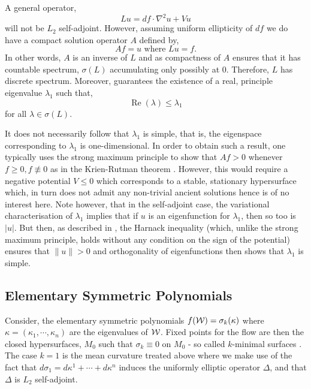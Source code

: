 \documentclass{amsart}
\begin{document}
A general operator,
\[
L u = df \cdot \nabla^2 u + V u
\]
will not be \(L_2\) self-adjoint. However, assuming uniform ellipticity of \(df\) we do have a compact solution operator \(A\) defined by,
\[
A f = u \text{ where } Lu = f.
\]
In other words, \(A\) is an inverse of \(L\) and as compactness of \(A\) ensures that it has countable spectrum, \(\sigma(L)\) accumulating only possibly at \(0\). Therefore, \(L\) has discrete spectrum. Moreover, \cite{protterweinberger:/1966} guarantees the existence of a real, principle eigenvalue \(\lambda_1\) such that,
\[
\operatorname{Re} (\lambda) \leq \lambda_1
\]
for all \(\lambda \in \sigma(L)\).

\begin{rem}
It does not necessarily follow that \(\lambda_1\) is simple, that is, the eigenspace corresponding to \(\lambda_1\) is one-dimensional. In order to obtain such a result, one typically uses the strong maximum principle to show that \(A f > 0\) whenever \(f \geq 0, f \not\equiv 0\) as in the Krien-Rutman theorem \cite{kreinrutman-en:1950, kreinrutman:1948}. However, this would require a negative potential \(V \leq 0\) which corresponds to a stable, stationary hypersurface which, in turn does not admit any non-trivial ancient solutions hence is of no interest here. Note however, that in the self-adjoint case, the variational characterisation of \(\lambda_1\) implies that if \(u\) is an eigenfunction for \(\lambda_1\), then so too is \(|u|\). But then, as described in \cite[Section 8.12]{GilbargTrudinger:/2001}, the Harnack inequality (which, unlike the strong maximum principle, holds without any condition on the sign of the potential) ensures that \(\|u\| > 0\) and orthogonality of eigenfunctions then shows that \(\lambda_1\) is simple.
\end{rem}

\subsection{Elementary Symmetric Polynomials}
\label{subsec:linearisation_elementarysymmetric}

Consider, the elementary symmetric polynomials \(f(\operatorname{\mathcal{W}}) = \sigma_k(\kappa)\) where \(\kappa = (\kappa_1, \cdots, \kappa_n)\) are the eigenvalues of \(\operatorname{\mathcal{W}}\). Fixed points for the flow are then the closed hypersurfaces, \(M_0\) such that \(\sigma_k \equiv 0\) on \(M_0\) - so called \(k\)-minimal surfaces \cite{}. The case \(k = 1\) is the mean curvature treated above where we make use of the fact that \(d\sigma_1 = d\kappa^1 + \cdots + d\kappa^n\) induces the uniformly elliptic operator \(\Delta\), and that \(\Delta\) is \(L_2\) self-adjoint.
\end{document}
